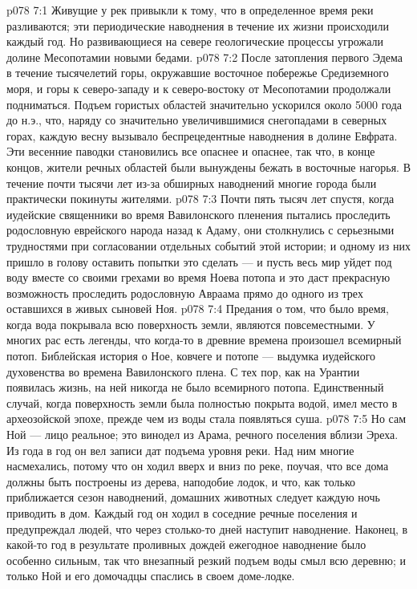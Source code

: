 \vs p078 7:1 Живущие у рек привыкли к тому, что в определенное время реки разливаются; эти периодические наводнения в течение их жизни происходили каждый год. Но развивающиеся на севере геологические процессы угрожали долине Месопотамии новыми бедами.
\vs p078 7:2 После затопления первого Эдема в течение тысячелетий горы, окружавшие восточное побережье Средиземного моря, и горы к северо\hyp{}западу и к северо\hyp{}востоку от Месопотамии продолжали подниматься. Подъем гористых областей значительно ускорился около 5000 года до н.э., что, наряду со значительно увеличившимися снегопадами в северных горах, каждую весну вызывало беспрецедентные наводнения в долине Евфрата. Эти весенние паводки становились все опаснее и опаснее, так что, в конце концов, жители речных областей были вынуждены бежать в восточные нагорья. В течение почти тысячи лет из\hyp{}за обширных наводнений многие города были практически покинуты жителями.
\vs p078 7:3 \pc Почти пять тысяч лет спустя, когда иудейские священники во время Вавилонского пленения пытались проследить родословную еврейского народа назад к Адаму, они столкнулись с серьезными трудностями при согласовании отдельных событий этой истории; и одному из них пришло в голову оставить попытки это сделать --- и пусть весь мир уйдет под воду вместе со своими грехами во время Ноева потопа и это даст прекрасную возможность проследить родословную Авраама прямо до одного из трех оставшихся в живых сыновей Ноя.
\vs p078 7:4 Предания о том, что было время, когда вода покрывала всю поверхность земли, являются повсеместными. У многих рас есть легенды, что когда\hyp{}то в древние времена произошел всемирный потоп. Библейская история о Ное, ковчеге и потопе --- выдумка иудейского духовенства во времена Вавилонского плена. С тех пор, как на Урантии появилась жизнь, на ней никогда не было всемирного потопа. Единственный случай, когда поверхность земли была полностью покрыта водой, имел место в археозойской эпохе, прежде чем из воды стала появляться суша.
\vs p078 7:5 Но сам Ной --- лицо реальное; это винодел из Арама, речного поселения вблизи Эреха. Из года в год он вел записи дат подъема уровня реки. Над ним многие насмехались, потому что он ходил вверх и вниз по реке, поучая, что все дома должны быть построены из дерева, наподобие лодок, и что, как только приближается сезон наводнений, домашних животных следует каждую ночь приводить в дом. Каждый год он ходил в соседние речные поселения и предупреждал людей, что через столько\hyp{}то дней наступит наводнение. Наконец, в какой\hyp{}то год в результате проливных дождей ежегодное наводнение было особенно сильным, так что внезапный резкий подъем воды смыл всю деревню; и только Ной и его домочадцы спаслись в своем доме\hyp{}лодке.

